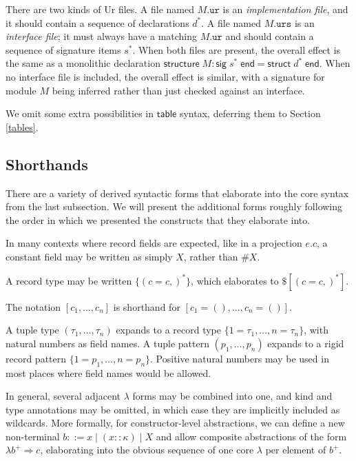 \documentclass{article}
\newcommand{\mt}[1]{\mathsf{#1}}
\begin{document}
There are two kinds of Ur files.  A file named $M\texttt{.ur}$ is an \emph{implementation file}, and it should contain a sequence of declarations $d^*$.  A file named $M\texttt{.urs}$ is an \emph{interface file}; it must always have a matching $M\texttt{.ur}$ and should contain a sequence of signature items $s^*$.  When both files are present, the overall effect is the same as a monolithic declaration $\mt{structure} \; M : \mt{sig} \; s^* \; \mt{end} = \mt{struct} \; d^* \; \mt{end}$.  When no interface file is included, the overall effect is similar, with a signature for module $M$ being inferred rather than just checked against an interface.

We omit some extra possibilities in $\mt{table}$ syntax, deferring them to Section \ref{tables}.

\subsection{Shorthands}

There are a variety of derived syntactic forms that elaborate into the core syntax from the last subsection.  We will present the additional forms roughly following the order in which we presented the constructs that they elaborate into.

In many contexts where record fields are expected, like in a projection $e.c$, a constant field may be written as simply $X$, rather than $\#X$.

A record type may be written $\{(c = c,)^*\}$, which elaborates to $\$[(c = c,)^*]$.

The notation $[c_1, \ldots, c_n]$ is shorthand for $[c_1 = (), \ldots, c_n = ()]$.

A tuple type $(\tau_1, \ldots, \tau_n)$ expands to a record type $\{1 = \tau_1, \ldots, n = \tau_n\}$, with natural numbers as field names.  A tuple pattern $(p_1, \ldots, p_n)$ expands to a rigid record pattern $\{1 = p_1, \ldots, n = p_n\}$.  Positive natural numbers may be used in most places where field names would be allowed.

In general, several adjacent $\lambda$ forms may be combined into one, and kind and type annotations may be omitted, in which case they are implicitly included as wildcards.  More formally, for constructor-level abstractions, we can define a new non-terminal $b ::= x \mid (x :: \kappa) \mid X$ and allow composite abstractions of the form $\lambda b^+ \Rightarrow c$, elaborating into the obvious sequence of one core $\lambda$ per element of $b^+$.
\end{document}
